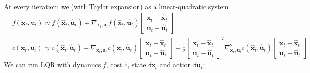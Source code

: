 At every iteration: we  (with Taylor expansion) as a linear-quadratic system
\begin{align}
	&f(\textbf{x}_t, \textbf{u}_t) \approx f(\widehat{\textbf{x}}_t, \widehat{\textbf{u}}_t) + \nabla_{\textbf{x}_t, \textbf{u}_t} f(\widehat{\textbf{x}}_t, \widehat{\textbf{u}}_t) \begin{bmatrix}
		\textbf{x}_t - \widehat{\textbf{x}}_t\\
		\textbf{u}_t - \widehat{\textbf{u}}_t
	\end{bmatrix}\\
	&c(\textbf{x}_t, \textbf{u}_t) \approx c(\widehat{\textbf{x}}_t, \widehat{\textbf{u}}_t) + \nabla_{\textbf{x}_t, \textbf{u}_t} c(\widehat{\textbf{x}}_t, \widehat{\textbf{u}}_t) \begin{bmatrix}
		\textbf{x}_t - \widehat{\textbf{x}}_t\\
		\textbf{u}_t - \widehat{\textbf{u}}_t
	\end{bmatrix} + \frac{1}{2} \begin{bmatrix}
		\textbf{x}_t - \widehat{\textbf{x}}_t\\
		\textbf{u}_t - \widehat{\textbf{u}}_t
	\end{bmatrix}^T \nabla_{\textbf{x}_t, \textbf{u}_t}^2 c(\widehat{\textbf{x}}_t, \widehat{\textbf{u}}_t) \begin{bmatrix}
		\textbf{x}_t - \widehat{\textbf{x}}_t\\
		\textbf{u}_t - \widehat{\textbf{u}}_t
	\end{bmatrix}
\end{align}
We can run \ac{LQR} with dynamics $\bar{f}$, cost $\bar{c}$, state $\delta\textbf{x}_t$ and action $\delta\textbf{u}_t$:
